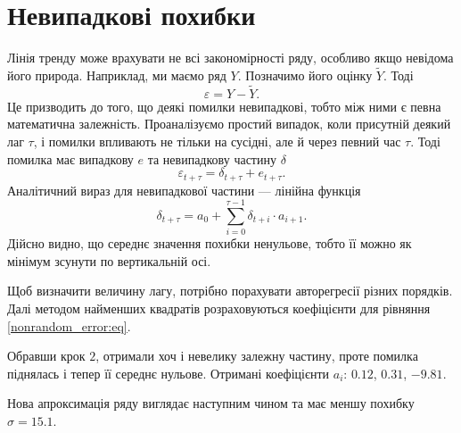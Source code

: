 \section{Невипадкові похибки}

Лінія тренду може врахувати не всі закономірності ряду,
особливо якщо невідома його природа.
Наприклад, ми маємо ряд $Y$.
Позначимо його оцінку $\tilde{Y}$.
Тоді
\begin{equation*}
  \varepsilon = Y - \tilde{Y}.
\end{equation*}
Це призводить до того, що деякі помилки невипадкові,
тобто між ними є певна математична залежність.
Проаналізуємо простий випадок,
коли присутній деякий лаг $\tau$,
і помилки впливають не тільки на сусідні,
але й через певний час $\tau$.
Тоді помилка має випадкову $e$ та невипадкову частину $\delta$
\begin{equation*}
  \varepsilon_{t + \tau} = \delta_{t + \tau} + e_{t + \tau}.
\end{equation*}
Аналітичний вираз для невипадкової частини --- лінійна функція
\begin{equation}\label{nonrandom_error:eq}
  \delta_{t + \tau}
  = a_0 + \sum_{i = 0}^{\tau - 1} \delta_{t + i} \cdot a_{i + 1}.
\end{equation}
Дійсно видно, що середнє значення похибки ненульове,
тобто її можно як мінімум зсунути по вертикальній осі.
\begin{center}
\end{center}

Щоб визначити величину лагу, потрібно порахувати авторегресії різних порядків.
Далі методом найменших квадратів розраховуються коефіцієнти для рівняння
\eqref{nonrandom_error:eq}.
\begin{center}
\end{center}

Обравши крок $2$, отримали хоч і невелику залежну частину,
проте помилка піднялась і тепер її середнє нульове.
Отримані коефіцієнти $a_i$: $0.12$, $0.31$, $-9.81$.
\begin{center}
\end{center}

Нова апроксимація ряду виглядає наступним чином та має меншу похибку
$\sigma = 15.1$.
\begin{center}
\end{center}

